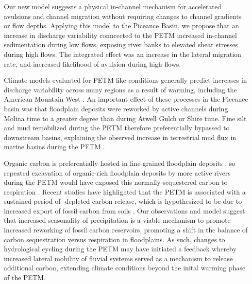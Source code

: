 \documentclass[draft]{compact_proposal}\usepackage[]{graphicx}\usepackage[]{color}
\newcommand{\del}[3]{\ce{\delta^#1#2_{#3}}}
\begin{document}
Our new model suggests a physical in-channel mechanism for accelerated avulsions and channel migration without requiring changes to channel gradients or flow depths. 
Applying this model to the Piceance Basin, we propose that an increase in discharge variability conncected to the PETM increased in-channel sedimentation during low flows, exposing river banks to elevated shear stresses during high flows. 
The integrated effect was an increase in the lateral migration rate, and increased likelihood of avulsion during high flows. 

Climate models evaluated for PETM-like conditions generally predict increases in discharge variability across many regions as a result of warming, including the American Mountain West \parencite{carmichael_hydrological_2017}. 
An important effect of these processes in the Piceance basin was that floodplain deposits were reworked by active channels during Molina time to a greater degree than during Atwell Gulch or Shire time.
Fine silt and mud remobilized during the PETM therefore preferentially bypassed to downstream basins, explaining the observed increase in terrestrial mud flux in marine basins during the PETM \parencite{slotnick_large_2012, gibson_stratigraphic_2000}.

Organic carbon is preferentially hosted in fine-grained floodplain deposits \cnote, so repeated excavation of organic-rich floodplain deposits by more active rivers during the PETM would have exposed this normally-sequestered carbon to respiration \parencite{bouchez_oxidation_2010}.
Recent studies have highlighted that the PETM is associated with a sustained period of \del{13}{C}{}-depleted carbon release, which is hypothesized to be due to increased export of fossil carbon from soils \parencite{lyons_palaeoceneeocene_2019}.
Our observations and model suggest that increased seasonality of precipitation is a viable mechanism to promote increased reworking of fossil carbon reservoirs, promoting a shift in the balance of carbon sequestration versus respiration in floodplains.
As such, changes to hydrological cycling during the PETM may have initiated a feedback whereby increased lateral mobility of fluvial systems served as a mechanism to release additional carbon, extending climate conditions beyond the inital warming phase of the PETM. 


% 
\printbibliography
% 
\end{document}
